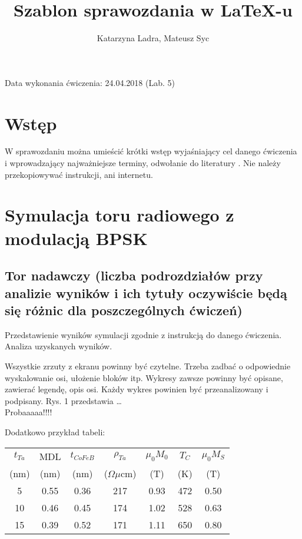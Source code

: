 \documentclass{article}
\author{Katarzyna Ladra, Mateusz Syc}		%
\title{Szablon sprawozdania w \LaTeX-u}		%
\date{}
\begin{document}
\maketitle %


Data wykonania ćwiczenia: 24.04.2018 (Lab. 5)
\\

\section{Wstęp}
W sprawozdaniu można umieścić krótki wstęp
wyjaśniający cel danego ćwiczenia i wprowadzający najważniejsze terminy, odwołanie do literatury \cite{USRP, Szostka, IQ, ieee}. Nie należy przekopiowywać instrukcji, ani internetu.

\section{Symulacja toru radiowego z modulacją BPSK}

\subsection{Tor nadawczy (liczba podrozdziałów przy analizie wyników i ich tytuły oczywiście będą się różnic dla poszczególnych ćwiczeń)}

Przedstawienie wyników symulacji zgodnie z instrukcją do danego ćwiczenia. Analiza uzyskanych wyników.



Wszystkie zrzuty z ekranu powinny być czytelne. Trzeba zadbać o odpowiednie wyskalowanie osi, ułożenie bloków itp. Wykresy zawsze powinny być opisane, zawierać legendę, opis osi. Każdy wykres powinien być przeanalizowany i podpisany. Rys. 1 przedstawia … \\

Probaaaaa!!!!

Dodatkowo przykład tabeli:

\begin{table}[!ht]
\label{tab:Static}
\centering
\begin{tabular}{ccccccc}
$t_{Ta}$ & MDL & $t_{CoFeB}$ & $\rho_{Ta}$ & $\mu_{0}M_{0}$ & $T_{C}$ & $\mu_{0}M_{S}$ \\
(nm) & (nm) & (nm) & ($\Omega\mu$cm) & (T) & (K) & (T) \\
\hline
5 & 0.55 & 0.36 & 217 & 0.93 & 472 & 0.50 \\
10 & 0.46 & 0.45 & 174 & 1.02 & 528 & 0.63 \\
15 & 0.39 & 0.52 & 171 & 1.11 & 650 & 0.80 \\
\end{tabular}
\end{table}
\end{document}
